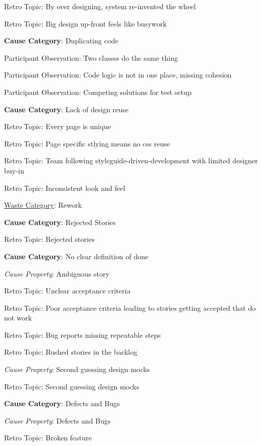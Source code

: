 \quad \quad Retro Topic: By over designing, system re-invented the wheel

\quad \quad Retro Topic: Big design up-front feels like busywork

\quad \textbf{Cause Category}: Duplicating code

\quad \quad Participant Observation: Two classes do the same thing

\quad \quad Participant Observation: Code logic is not in one place, missing cohesion

\quad \quad Participant Observation: Competing solutions for test setup

\quad \textbf{Cause Category}: Lack of design reuse

\quad \quad Retro Topic: Every page is unique

\quad \quad Retro Topic: Page specific stlying means no css reuse

\quad \quad Retro Topic: Team following styleguide-driven-development with limited designer buy-in

\quad \quad Retro Topic: Inconsistent look and feel



\underline{Waste Category}: Rework

\quad \textbf{Cause Category}: Rejected Stories

\quad \quad Retro Topic: Rejected stories

\quad \textbf{Cause Category}: No clear definition of done

\quad \quad \textit{Cause Property}: Ambiguous story

\quad \quad \quad Retro Topic: Unclear acceptance criteria

\quad \quad \quad Retro Topic: Poor acceptance criteria leading to stories getting accepted that do not work

\quad \quad \quad Retro Topic: Bug reports missing repeatable steps

\quad \quad \quad Retro Topic: Rushed stories in the backlog

\quad \quad \textit{Cause Property}: Second guessing design mocks

\quad \quad \quad Retro Topic: Second guessing design mocks

\quad \textbf{Cause Category}: Defects and Bugs

\quad \quad \textit{Cause Property}: Defects and Bugs

\quad \quad \quad Retro Topic: Broken feature

